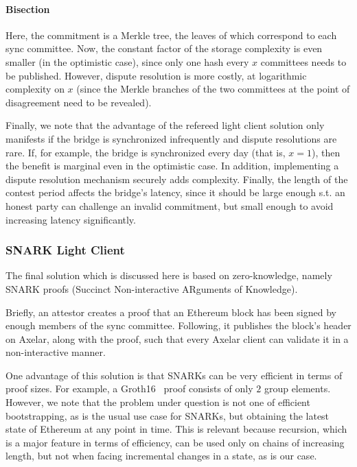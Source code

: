 \paragraph{Bisection}
Here, the commitment is a Merkle tree, the leaves of which correspond to each
sync committee. Now, the constant factor of the storage complexity is even
smaller (in the optimistic case), since only one hash every $x$ committees
needs to be published. However, dispute resolution is more costly, at
logarithmic complexity on $x$ (since the Merkle branches of the two committees
at the point of disagreement need to be revealed).

Finally, we note that the advantage of the refereed light client solution only
manifests if the bridge is synchronized infrequently and dispute resolutions
are rare. If, for example, the bridge is synchronized every day (that is, $x =
1$), then the benefit is marginal even in the optimistic case. In addition,
implementing a dispute resolution mechanism securely adds complexity. Finally,
the length of the contest period affects the bridge's latency, since it should
be large enough s.t. an honest party can challenge an invalid commitment, but
small enough to avoid increasing latency significantly.

\subsubsection{SNARK Light Client}

The final solution which is discussed here is based on zero-knowledge, namely
SNARK proofs (Succinct Non-interactive ARguments of Knowledge).

Briefly, an attestor creates a proof that an Ethereum block has been signed by
enough members of the sync committee. Following, it publishes the block's
header on Axelar, along with the proof, such that every Axelar client can
validate it in a non-interactive manner.

One advantage of this solution is that SNARKs can be very efficient in terms of
proof sizes. For example, a Groth16~\cite{EC:Groth16} proof consists of only
$2$ group elements. However, we note that the problem under question is not one
of efficient bootstrapping, as is the usual use case for SNARKs, but obtaining
the latest state of Ethereum at any point in time. This is relevant because
recursion, which is a major feature in terms of efficiency, can be used only on
chains of increasing length, but not when facing incremental changes in a
state, as is our case.

